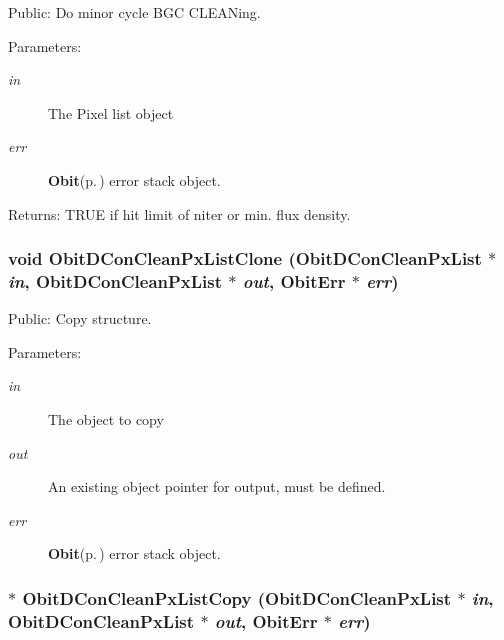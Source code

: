 Public: Do minor cycle BGC CLEANing. 

\begin{Desc}
\item[Parameters:]
\begin{description}
\item[{\em in}]The Pixel list object \item[{\em err}]{\bf Obit}{\rm (p.\,\pageref{structObit})} error stack object. \end{description}
\end{Desc}
\begin{Desc}
\item[Returns:]TRUE if hit limit of niter or min. flux density. \end{Desc}
\subsubsection{\setlength{\rightskip}{0pt plus 5cm}void Obit\-DCon\-Clean\-Px\-List\-Clone ({\bf Obit\-DCon\-Clean\-Px\-List} $\ast$ {\em in}, {\bf Obit\-DCon\-Clean\-Px\-List} $\ast$ {\em out}, {\bf Obit\-Err} $\ast$ {\em err})}\label{ObitDConCleanPxList_8h_a15}


Public: Copy structure. 

\begin{Desc}
\item[Parameters:]
\begin{description}
\item[{\em in}]The object to copy \item[{\em out}]An existing object pointer for output, must be defined. \item[{\em err}]{\bf Obit}{\rm (p.\,\pageref{structObit})} error stack object. \end{description}
\end{Desc}
\subsubsection{$\ast$ Obit\-DCon\-Clean\-Px\-List\-Copy ({\bf Obit\-DCon\-Clean\-Px\-List} $\ast$ {\em in}, {\bf Obit\-DCon\-Clean\-Px\-List} $\ast$ {\em out}, {\bf Obit\-Err} $\ast$ {\em err})}\label{ObitDConCleanPxList_8h_a14}


